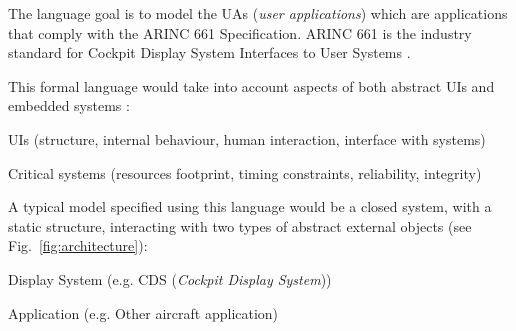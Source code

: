 \documentclass{sigchi}
\newenvironment{packed_itemize}{
\begin{itemize}
  \setlength{\itemsep}{1pt}
  \setlength{\parskip}{0pt}
}{\end{itemize}}
\begin{document}
\begin{figure*}
{
}

\caption{Aircraft UIs architecture. The UA interacts with the CDS one one side, and with other aircraft applications on the other side.}
\label{fig:architecture}
\end{figure*}

The language goal is to model the UAs (\emph{user applications}) which are applications that comply with the ARINC 661 Specification.
ARINC 661 is the industry standard for Cockpit Display System Interfaces to User Systems \cite{ARINC661}.

This formal language would take into account aspects of both abstract UIs and embedded systems :
\begin{packed_itemize}
\item{UIs (structure, internal behaviour, human interaction, interface with systems)}
\item{Critical systems (resources footprint, timing constraints, reliability, integrity)}
\end{packed_itemize}

A typical model specified using this language would be a closed system, with a static structure, interacting with two types of abstract external objects (see Fig.~\ref{fig:architecture}):
\begin{packed_itemize}
\item{Display System (e.g. CDS (\emph{Cockpit Display System}))}
\item{Application (e.g. Other aircraft application)}
\end{packed_itemize}
\end{document}
